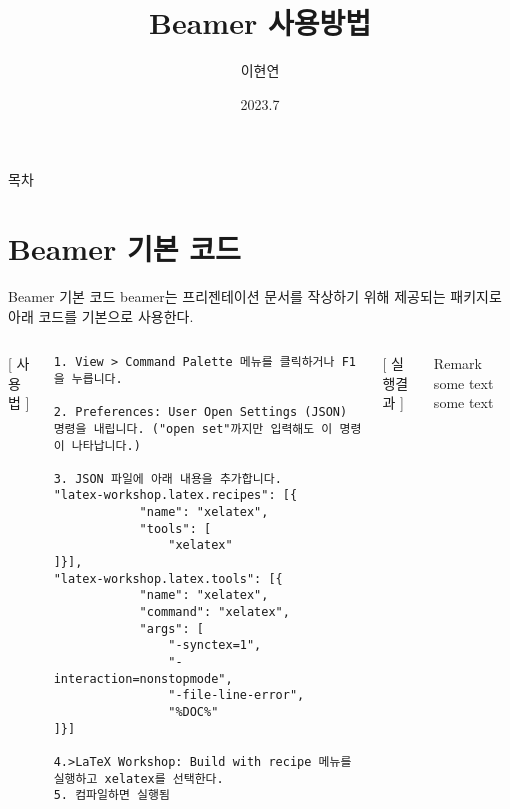 \documentclass[12pt, aspectratio=169]{beamer}
\title{Beamer 사용방법}
\author{이현연}
\date{2023.7}
\begin{document}
    \maketitle

    \begin{frame}{목차}
        \tableofcontents
    \end{frame}

    \section{Beamer 기본 코드}
    \begin{frame}[fragile]{Beamer 기본 코드}
        \noindent 
        beamer는 프리젠테이션 문서를 작상하기 위해 제공되는 패키지로 아래 코드를 기본으로 사용한다.
        \begin{columns}[T]
            {\footnotesize [ 사용법 ]}
                \begin{scriptsize}
                    \begin{verbatim}
1. View > Command Palette 메뉴를 클릭하거나 F1을 누릅니다.

2. Preferences: User Open Settings (JSON) 명령을 내립니다. ("open set"까지만 입력해도 이 명령이 나타납니다.)

3. JSON 파일에 아래 내용을 추가합니다.
"latex-workshop.latex.recipes": [{
            "name": "xelatex",
            "tools": [
                "xelatex"
]}],
"latex-workshop.latex.tools": [{
            "name": "xelatex",
            "command": "xelatex",
            "args": [
                "-synctex=1",
                "-interaction=nonstopmode",
                "-file-line-error",
                "%DOC%"
]}]

4.>LaTeX Workshop: Build with recipe 메뉴를 실행하고 xelatex를 선택한다.
5. 컴파일하면 실행됨
                    \end{verbatim}    
                \end{scriptsize}    
            {\footnotesize [ 실행결과 ]}
                \begin{block}{Remark}
                    some text
                    some text
                \end{block}
        \end{columns}
    \end{frame}
\end{document}
